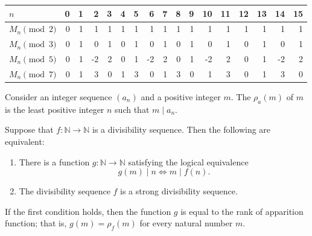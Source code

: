 \begin{example}
\begin{enumerate}
\begin{center}
      \renewcommand{\arraystretch}{1.25}
      \begin{tabular}{l|*{16}{C}}
        $n$             & 0 & 1 & 2 & 3 & 4 & 5 & 6 & 7 & 8 & 9 & 10 & 11 & 12 & 13 & 14 & 15 \\ \midrule
        $M_n\pmod{2}$ & 0 & 1 & 1 & 1 & 1 & 1 & 1 & 1 & 1 & 1 & 1 & 1 & 1 & 1 & 1 & 1 \\
        $M_n\pmod{3}$ & 0 & 1 & 0 & 1 & 0 & 1 & 0 & 1 & 0 & 1 & 0 & 1 & 0 & 1 & 0 & 1 \\
        $M_n\pmod{5}$ & 0 & 1 & -2 & 2 & 0 & 1 & -2 & 2 & 0 & 1 & -2 & 2 & 0 & 1 & -2 & 2 \\
        $M_n\pmod{7}$ & 0 & 1 & 3 & 0 & 1 & 3 & 0 & 1 & 3 & 0 & 1 & 3 & 0 & 1 & 3 & 0
      \end{tabular}
    \end{center}
  \end{enumerate}
\end{example}

\begin{definition}
  Consider an integer sequence $(a_n)$ and a positive integer $m$. The  $\rho_a(m)$ of $m$ is the least positive integer $n$ such that $m\mid a_n$.
\end{definition}

\begin{theorem}\label{theorem:rank-of-apparition}
  Suppose that $f:\mathbb{N}\to\mathbb{N}$ is a divisibility sequence. Then the following are equivalent:
  \begin{enumerate}
  \item There is a function $g:\mathbb{N}\to\mathbb{N}$ satisfying the logical equivalence
  \begin{equation*}
    g(m)\mid n \Leftrightarrow m\mid f(n).
  \end{equation*}
  \item The divisibility sequence $f$ is a strong divisibility sequence.
  \end{enumerate}
  If the first condition holds, then the function $g$ is equal to the rank of apparition function; that is, $g(m)=\rho_f(m)$ for every natural number $m$.
\end{theorem}


